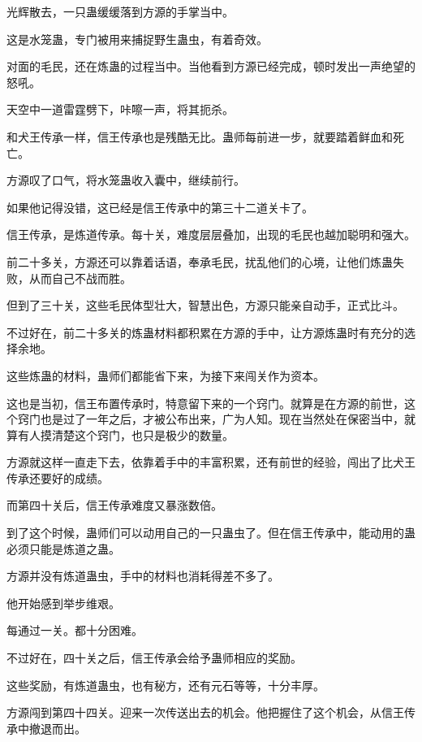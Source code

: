 
\begin{this_body}

光辉散去，一只蛊缓缓落到方源的手掌当中。

这是水笼蛊，专门被用来捕捉野生蛊虫，有着奇效。

对面的毛民，还在炼蛊的过程当中。当他看到方源已经完成，顿时发出一声绝望的怒吼。

天空中一道雷霆劈下，咔嚓一声，将其扼杀。

和犬王传承一样，信王传承也是残酷无比。蛊师每前进一步，就要踏着鲜血和死亡。

方源叹了口气，将水笼蛊收入囊中，继续前行。

如果他记得没错，这已经是信王传承中的第三十二道关卡了。

信王传承，是炼道传承。每十关，难度层层叠加，出现的毛民也越加聪明和强大。

前二十多关，方源还可以靠着话语，奉承毛民，扰乱他们的心境，让他们炼蛊失败，从而自己不战而胜。

但到了三十关，这些毛民体型壮大，智慧出色，方源只能亲自动手，正式比斗。

不过好在，前二十多关的炼蛊材料都积累在方源的手中，让方源炼蛊时有充分的选择余地。

这些炼蛊的材料，蛊师们都能省下来，为接下来闯关作为资本。

这也是当初，信王布置传承时，特意留下来的一个窍门。就算是在方源的前世，这个窍门也是过了一年之后，才被公布出来，广为人知。现在当然处在保密当中，就算有人摸清楚这个窍门，也只是极少的数量。

方源就这样一直走下去，依靠着手中的丰富积累，还有前世的经验，闯出了比犬王传承还要好的成绩。

而第四十关后，信王传承难度又暴涨数倍。

到了这个时候，蛊师们可以动用自己的一只蛊虫了。但在信王传承中，能动用的蛊必须只能是炼道之蛊。

方源并没有炼道蛊虫，手中的材料也消耗得差不多了。

他开始感到举步维艰。

每通过一关。都十分困难。

不过好在，四十关之后，信王传承会给予蛊师相应的奖励。

这些奖励，有炼道蛊虫，也有秘方，还有元石等等，十分丰厚。

方源闯到第四十四关。迎来一次传送出去的机会。他把握住了这个机会，从信王传承中撤退而出。


\end{this_body}
